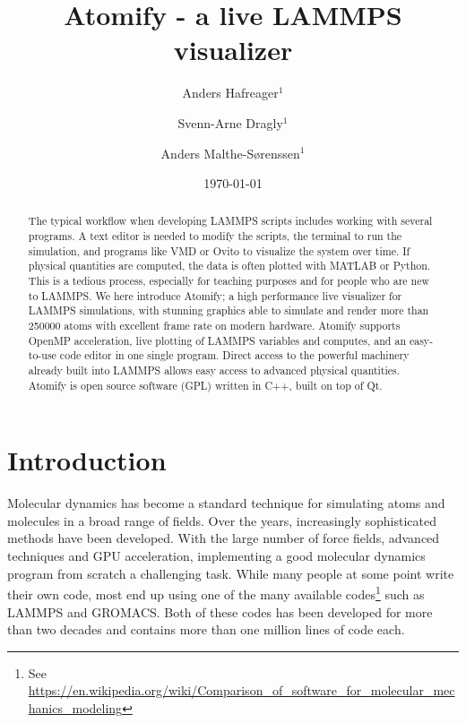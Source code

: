 \documentclass[aps,pre,twocolumn,letterpaper,floatfix,showpacs]{revtex4}
\begin{document}
\title{Atomify - a live LAMMPS visualizer}
\author{Anders Hafreager$^1$}
\author{Svenn-Arne Dragly$^{1}$} 
\author{Anders Malthe-S\o renssen$^1$}
\date{\today} 

\begin{abstract} 
The typical workflow when developing LAMMPS scripts includes working with several programs. A text editor is needed to modify the scripts, the terminal to run the simulation, and programs like VMD or Ovito to visualize the system over time. If physical quantities are computed, the data is often plotted with MATLAB or Python. This is a tedious process, especially for teaching purposes and for people who are new to LAMMPS. 
We here introduce Atomify; a high performance live visualizer for LAMMPS simulations, with stunning graphics able to simulate and render more than 250000 atoms with excellent frame rate on modern hardware. Atomify supports OpenMP acceleration, live plotting of LAMMPS variables and computes, and an easy-to-use code editor in one single program. Direct access to the powerful machinery already built into LAMMPS allows easy access to advanced physical quantities. Atomify is open source software (GPL) written in C++, built on top of Qt. 
\end{abstract} 
 
\maketitle
 
\section{Introduction}
Molecular dynamics has become a standard technique for simulating atoms and molecules in a broad range of fields. Over the years, increasingly sophisticated methods have been developed. With the large number of force fields, advanced techniques and GPU acceleration, implementing a good molecular dynamics program from scratch a challenging task. While many people at some point write their own code, most end up using one of the many available codes\footnote{See \url{https://en.wikipedia.org/wiki/Comparison_of_software_for_molecular_mechanics_modeling}} such as LAMMPS\cite{plimpton1995fast} and GROMACS\cite{Pronk2013}. Both of these codes has been developed for more than two decades and contains more than one million lines of code each. 
\end{document}
